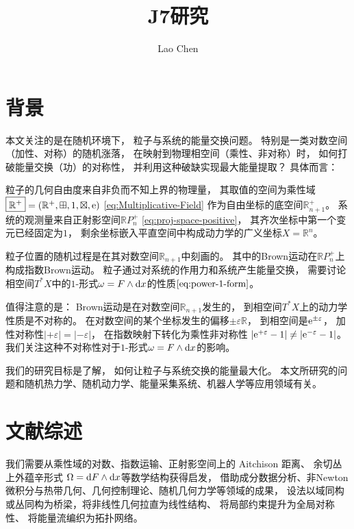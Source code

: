 ﻿\documentclass[10pt,a4paper]{article}
\numberwithin{equation}{section}
\newcommand{\sqplus}{\mathbin{\boxplus}}
\newcommand{\sqtimes}{\mathbin{\boxtimes}}
\begin{document}
\title{\textbf{J7研究}\\  }
\author{Lao Chen}
\maketitle
\setcounter{tocdepth}{1}
\tableofcontents 


\section{背景}

本文关注的是在随机环境下，
粒子与系统的能量交换问题。
特别是一类对数空间（加性、对称）的随机涨落，
在映射到物理相空间（乘性、非对称）时，
如何打破能量交换（功）的对称性，
并利用这种破缺实现最大能量提取？
具体而言：

粒子的几何自由度来自非负而不知上界的物理量，
其取值的空间为乘性域
$\boxed{\mathbb R^+} = (\mathbb R^+,\sqplus,1,\sqtimes,\text e)$
\eqref{eq:Multiplicative-Field}
作为自由坐标的底空间$\boxed{\mathbb R^+_{n+1}}$。
系统的观测量来自正射影空间$\mathbb R P^+_n$
\eqref{eq:proj-space-positive}，
其齐次坐标中第一个变元已经固定为$1$，
剩余坐标嵌入平直空间中构成动力学的广义坐标$X = \mathbb R^n$。

粒子位置的随机过程是在其对数空间$\mathbb R_{n+1}$中刻画的。
其中的Brown运动在$\mathbb R P^+_n$上构成指数Brown运动。
粒子通过对系统的作用力和系统产生能量交换，
需要讨论相空间$T^*X$中的$1$-形式$\omega = F \wedge \text dx$的性质$\eqref{eq:power-1-form}$。

值得注意的是：
Brown运动是在对数空间$\mathbb R_{n+1}$发生的，
到相空间$T^*X$上的动力学性质是不对称的。
在对数空间的某个坐标发生的偏移$\pm\varepsilon \mathbb R$，
到相空间是$\text e^{\pm\varepsilon}$，
加性对称性$|+\varepsilon| = |-\varepsilon|$，
在指数映射下转化为乘性非对称性
$|\text e^{+\varepsilon} - 1| \neq |\text e^{-\varepsilon} - 1|$。
我们关注这种不对称性对于$1$-形式$\omega = F \wedge \text dx$的影响。

我们的研究目标是了解，
如何让粒子与系统交换的能量最大化。
本文所研究的问题和随机热力学、随机动力学、能量采集系统、机器人学等应用领域有关。

\section{文献综述}

我们需要从乘性域的对数、指数运输、正射影空间上的 Aitchison 距离、
余切丛上外蕴辛形式 $\Omega = \text dF \wedge \text dx$等数学结构获得启发，
借助成分数据分析、非Newton微积分与热带几何、几何控制理论、随机几何力学等领域的成果，
设法以域同构或丛同构为桥梁，将非线性几何拉直为线性结构、
将局部约束提升为全局对称性、
将能量流编织为拓扑网络。
\end{document}
